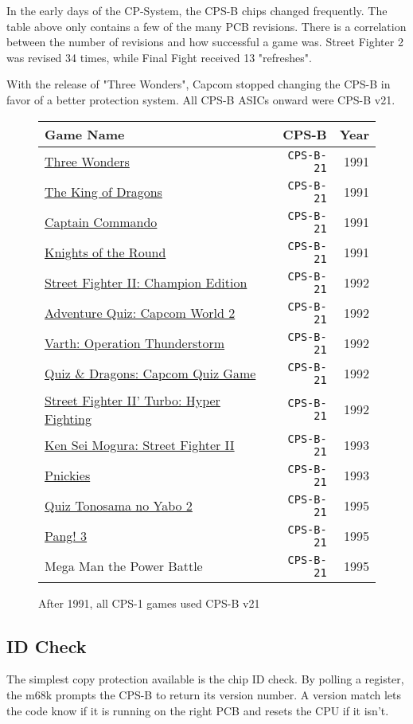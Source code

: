 In the early days of the CP-System, the CPS-B chips changed frequently. The table above only contains a few of the many PCB revisions. There is a correlation between the number of revisions and how successful a game was. Street Fighter 2 was revised 34 times, while Final Fight received 13 "refreshes".

With the release of "Three Wonders", Capcom stopped changing the CPS-B in favor of a better protection system. All CPS-B ASICs onward were CPS-B v21.

\begin{figure}[H]
{ \setlength{\tabcolsep}{3.0pt}
\begin{tabularx}{\textwidth}{Xrr} 
  \textbf{Game Name} & \textbf{ CPS-B }  & \textbf{ Year } \\               
  \toprule    
\href{}{Three Wonders} &  \texttt{CPS-B-21} & 1991 \\ 
\href{}{The King of Dragons} &  \texttt{CPS-B-21} &1991 \\ 
\href{}{Captain Commando} &  \texttt{CPS-B-21} & 1991 \\ 
\href{}{Knights of the Round} &  \texttt{CPS-B-21} &1991 \\ 
  \toprule    
\href{}{Street Fighter II: Champion Edition} &  \texttt{CPS-B-21} &1992 \\ 
\href{}{Adventure Quiz: Capcom World 2} &  \texttt{CPS-B-21} &1992 \\ 
\href{}{Varth: Operation Thunderstorm} &  \texttt{CPS-B-21} &1992 \\ 
\href{}{Quiz \& Dragons: Capcom Quiz Game} &  \texttt{CPS-B-21} &1992 \\ 
\href{}{Street Fighter II' Turbo: Hyper Fighting} &  \texttt{CPS-B-21} & 1992 \\ 
  \toprule    
\href{}{Ken Sei Mogura: Street Fighter II} &  \texttt{CPS-B-21} &1993 \\ 
\href{}{Pnickies} &  \texttt{CPS-B-21} &1993 \\ 
  \toprule    
\href{}{Quiz Tonosama no Yabo 2} &  \texttt{CPS-B-21} & 1995 \\ 
\href{}{Pang! 3} & \texttt{CPS-B-21}  & 1995 \\ 
Mega Man the Power Battle & \texttt{CPS-B-21}  & 1995 \\

\toprule    
\end{tabularx}%
}\caption*{After 1991, all CPS-1 games used CPS-B v21}
\end{figure}


\subsection{ID Check}
The simplest copy protection available is the chip ID check. By polling a register, the m68k prompts the CPS-B to return its version number. A version match lets the code know if it is running on the right PCB and resets the CPU if it isn't. 

